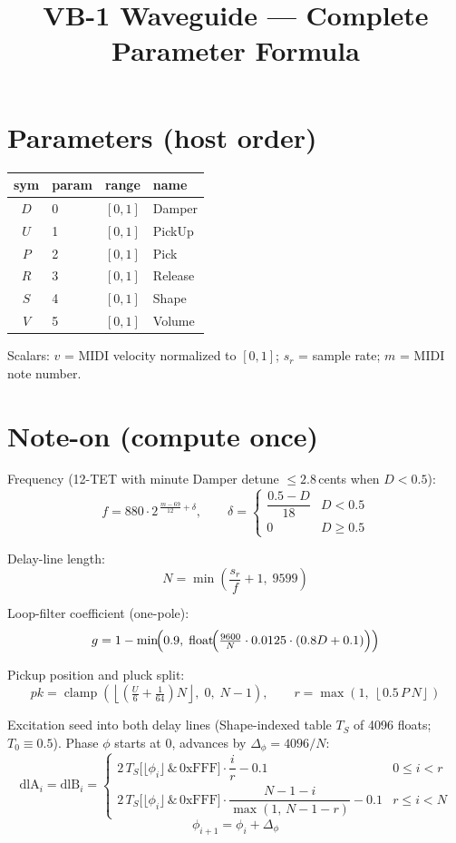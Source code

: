 \documentclass[11pt]{article}
\title{VB-1 Waveguide --- Complete Parameter Formula}
\date{}
\begin{document}
\maketitle

\section*{Parameters (host order)}

\begin{center}
\begin{tabular}{c l c l}
\toprule
sym & param & range & name \\
\midrule
$D$ & 0 & $[0,1]$ & Damper \\
$U$ & 1 & $[0,1]$ & PickUp \\
$P$ & 2 & $[0,1]$ & Pick \\
$R$ & 3 & $[0,1]$ & Release \\
$S$ & 4 & $[0,1]$ & Shape \\
$V$ & 5 & $[0,1]$ & Volume \\
\bottomrule
\end{tabular}
\end{center}

Scalars: $v$ = MIDI velocity normalized to $[0,1]$;\;
$s_r$ = sample rate;\;
$m$ = MIDI note number.

\section*{Note-on (compute once)}

Frequency (12-TET with minute Damper detune $\le 2.8$\,cents when $D<0.5$):
\[
f = 880\cdot 2^{\,\frac{m-69}{12}+\delta},
\qquad
\delta =
\begin{cases}
\dfrac{0.5-D}{18} & D < 0.5 \\[6pt]
0 & D \ge 0.5
\end{cases}
\]

Delay-line length:
\[
N = \min\!\left(\frac{s_r}{f}+1,\; 9599\right)
\]

Loop-filter coefficient (one-pole):
\[
g = 1 - \min\!\Bigl(0.9,\;\operatorname{float}\!\Bigl(\tfrac{9600}{N}\cdot 0.0125 \cdot (0.8D + 0.1)\Bigr)\Bigr)
\]

Pickup position and pluck split:
\[
pk = \operatorname{clamp}\!\left(\left\lfloor\left(\tfrac{U}{6}+\tfrac{1}{64}\right)N\right\rfloor,\;0,\;N-1\right),
\qquad
r = \max\!\left(1,\;\left\lfloor 0.5\,P\,N\right\rfloor\right)
\]

Excitation seed into both delay lines (Shape-indexed table $T_S$ of 4096 floats;
$T_0 \equiv 0.5$). Phase $\phi$ starts at $0$, advances by $\Delta_\phi = 4096/N$:
\[
\text{dlA}_i = \text{dlB}_i =
\begin{cases}
2\,T_S\!\bigl[\lfloor\phi_i\rfloor \,\&\, \mathrm{0xFFF}\bigr]\cdot\dfrac{i}{r}-0.1 & 0 \le i < r \\[8pt]
2\,T_S\!\bigl[\lfloor\phi_i\rfloor \,\&\, \mathrm{0xFFF}\bigr]\cdot\dfrac{N-1-i}{\max(1,\,N-1-r)}-0.1 & r \le i < N
\end{cases}
\]
\[
\phi_{i+1} = \phi_i + \Delta_\phi
\]
\end{document}
